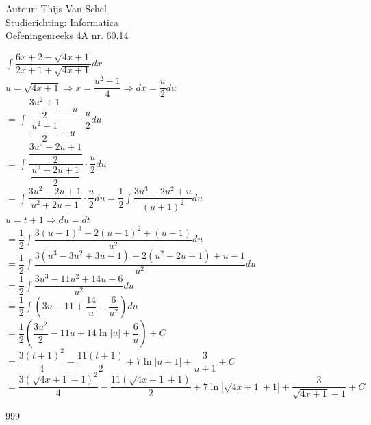 \documentclass[a4paper]{article}
\newcommand{\dint}{\displaystyle\int}
\begin{document}
  
\noindent \large Auteur: Thijs Van Schel \\
\noindent \large Studierichting: Informatica\\
\noindent \large Oefeningenreeks 4A nr. 60.14\\

\medskip

\normalsize

$\dint \dfrac{6x+2-\sqrt{4x+1}}{2x+1+\sqrt{4x+1}} dx$\\

$u = \sqrt{4x+1} \Rightarrow x = \dfrac{u^2-1}{4} \Rightarrow dx = \dfrac{u}{2} du$\\

$= \dint \dfrac{\dfrac{3u^2+1}{2} - u}{\dfrac{u^2+1}{2} + u} \cdot \dfrac{u}{2} du$\\

$= \dint \dfrac{\dfrac{3u^2-2u+1}{2}}{\dfrac{u^2+2u+1}{2}} \cdot \dfrac{u}{2} du$\\

$= \dint \dfrac{3u^2-2u+1}{u^2+2u+1} \cdot \dfrac{u}{2} du = \dfrac{1}{2} \dint \dfrac{3u^3-2u^2+u}{(u+1)^2} du$\\

$u = t+1 \Rightarrow du = dt$\\

$= \dfrac{1}{2} \dint \dfrac{3(u-1)^3 - 2(u-1)^2 + (u-1)}{u^2} du$\\

$= \dfrac{1}{2} \dint \dfrac{3(u^3-3u^2+3u-1) - 2(u^2-2u+1) + u - 1}{u^2} du$\\

$= \dfrac{1}{2} \dint \dfrac{3u^3 - 11u^2 + 14u - 6}{u^2} du$\\

$= \dfrac{1}{2} \dint \left( 3u - 11 + \dfrac{14}{u} - \dfrac{6}{u^2} \right) du$\\

$= \dfrac{1}{2} \left(\dfrac{3u^2}{2} - 11u + 14 \ln |u| + \dfrac{6}{u} \right) + C$\\

$= \dfrac{3(t+1)^2}{4} - \dfrac{11(t+1)}{2} + 7 \ln |u+1| + \dfrac{3}{u+1} + C$\\

$= \dfrac{3(\sqrt{4x+1}+1)^2}{4} - \dfrac{11(\sqrt{4x+1}+1)}{2} + 7 \ln |\sqrt{4x+1}+1| + \dfrac{3}{\sqrt{4x+1}+1} + C$

\begin{thebibliography}{999}
\end{thebibliography}
\end{document}

